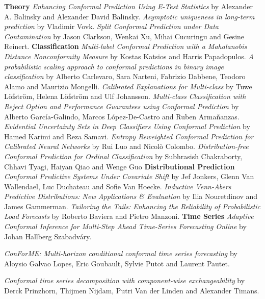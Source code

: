 \documentclass[twoside,11pt]{article}
\begin{document}
\begin{outline}
    \1\textbf{Theory}
        \2\emph{Enhancing Conformal Prediction Using E-Test Statistics} by Alexander A. Balinsky and Alexander David Balinsky.
        \2\emph{Asymptotic uniqueness in long-term prediction} by Vladimir Vovk.
        \2\emph{Split Conformal Prediction under Data Contamination} by Jason Clarkson, Wenkai Xu, Mihai Cucuringu and Gesine Reinert.
    \1\textbf{Classification}
        \2\emph{Multi-label Conformal Prediction with a Mahalanobis Distance Nonconformity Measure} by Kostas Katsios and Harris Papadopulos.
        \2\emph{A probabilistic scaling approach to conformal predictions in binary image classification} by Alberto Carlevaro, Sara Narteni, Fabrizio Dabbene, Teodoro Alamo and Maurizio Mongelli. 
        \2\emph{Calibrated Explanations for Multi-class} by Tuwe Löfström, Helena Löfström and Ulf Johansson.
        \2\emph{Multi-class Classification with Reject Option and Performance Guarantees using Conformal Prediction} by Alberto García-Galindo, Marcos López-De-Castro and Ruben Armañanzas. 
        \2\emph{Evidential Uncertainty Sets in Deep Classifiers Using Conformal Prediction} by Hamed Karimi and Reza Samavi. 
        \2\emph{Entropy Reweighted Conformal Prediction for Calibrated Neural Networks} by Rui Luo and Nicolò Colombo.
        \2\emph{Distribution-free Conformal Prediction for Ordinal Classification} by Subhrasish Chakraborty, Chhavi Tyagi, Haiyan Qiao and Wenge Guo
    \1\textbf{Distributional Prediction}
        \2\emph{Conformal Predictive Systems Under Covariate Shift} by Jef Jonkers, Glenn Van Wallendael, Luc Duchateau and Sofie Van Hoecke.
        \2\emph{Inductive Venn-Abers Predictive Distributions: New Applications \& Evaluation} by Ilia Nouretdinov and James Gammerman.
        \2\emph{Tailoring the Tails: Enhancing the Reliability of Probabilistic Load Forecasts} by Roberto Baviera and Pietro Manzoni.
    \1\textbf{Time Series}
        \2\emph{Adaptive Conformal Inference for Multi-Step Ahead Time-Series Forecasting Online} by Johan Hallberg Szabadváry.

        \2\emph{ConForME: Multi-horizon conditional conformal time series forecasting} by Aloysio Galvao Lopes, Eric Goubault, Sylvie Putot and Laurent Pautet.

        \2\emph{Conformal time series decomposition with component-wise exchangeability} by Derck Prinzhorn, Thijmen Nijdam, Putri Van der Linden and Alexander Timans.


\end{outline}
\end{document}
